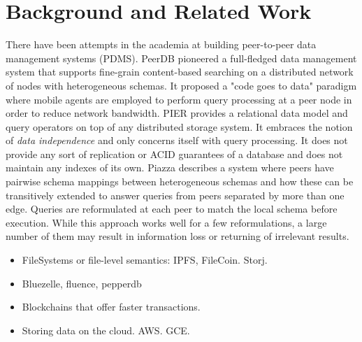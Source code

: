 \section{Background and Related Work}
There have been attempts in the academia at building peer-to-peer data management systems (PDMS). PeerDB \cite{PeerDB} pioneered a full-fledged data management system that supports fine-grain content-based searching on a distributed network of nodes with heterogeneous schemas. It proposed a "code goes to data" paradigm where mobile agents are employed to perform query processing at a peer node in order to reduce network bandwidth. PIER \cite{PIER} provides a relational data model and query operators on top of any distributed storage system. It embraces the notion of \textit{data independence} and only concerns itself with query processing. It does not provide any sort of replication or ACID guarantees of a database and does not maintain any indexes of its own. Piazza \cite{Piazza} describes a system where peers have pairwise schema mappings between heterogeneous schemas and how these can be transitively extended to answer queries from peers separated by more than one edge. Queries are reformulated at each peer to match the local schema before execution. While this approach works well for a few reformulations, a large number of them may result in information loss or returning of irrelevant results.
\newline\newline

    \begin{itemize}
        \item FileSystems or file-level semantics: IPFS, FileCoin. Storj.
        \item Bluezelle, fluence, pepperdb
        \item Blockchains that offer faster transactions.
        \item Storing data on the cloud. AWS. GCE.
    \end{itemize}


